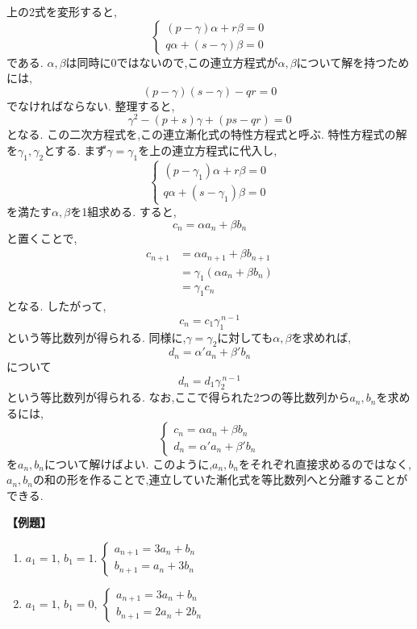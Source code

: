 上の2式を変形すると,
\[
  \begin{cases}
    (p-\gamma)\alpha+r\beta=0 \\
    q\alpha+(s-\gamma)\beta=0
  \end{cases}
\]
である.
$\alpha,\beta$は同時に$0$ではないので,この連立方程式が$\alpha,\beta$について解を持つためには,
\[
  (p-\gamma)(s-\gamma)-qr=0
\]
でなければならない.
整理すると,
\[
  \gamma^2-(p+s)\gamma+(ps-qr)=0
\]
となる.
この二次方程式を,この連立漸化式の特性方程式と呼ぶ.
特性方程式の解を$\gamma_1,\gamma_2$とする.
まず$\gamma=\gamma_1$を上の連立方程式に代入し,
\[
  \begin{cases}
    (p-\gamma_1)\alpha+r\beta=0 \\
    q\alpha+(s-\gamma_1)\beta=0
  \end{cases}
\]
を満たす$\alpha,\beta$を1組求める.
すると,
\[
  c_n=\alpha a_n+\beta b_n
\]
と置くことで,
\begin{align*}
  c_{n+1} & =\alpha a_{n+1}+\beta b_{n+1}   \\
          & =\gamma_1(\alpha a_n+\beta b_n) \\
          & =\gamma_1c_n
\end{align*}
となる.
したがって,
\[
  c_n=c_1\gamma_1^{\,n-1}
\]
という等比数列が得られる.
同様に,$\gamma=\gamma_2$に対しても$\alpha,\beta$を求めれば,
\[
  d_n=\alpha' a_n+\beta' b_n
\]
について
\[
  d_n=d_1\gamma_2^{\,n-1}
\]
という等比数列が得られる.
なお,ここで得られた2つの等比数列から$a_n,b_n$を求めるには,
\[
  \begin{cases}
    c_n=\alpha a_n+\beta b_n \\
    d_n=\alpha'a_n+\beta'b_n
  \end{cases}
\]
を$a_n,b_n$について解けばよい.
このように,$a_n,b_n$をそれぞれ直接求めるのではなく,$a_n,b_n$の和の形を作ることで,連立していた漸化式を等比数列へと分離することができる.

\noindent \textbf{【例題】}
\begin{enumerate}[label=(\arabic*),parsep=3pt]
  \item $\displaystyle a_1=1,\,b_1=1.\ \begin{cases}a_{n+1}=3a_n+b_n\\ b_{n+1}=a_n+3b_n\end{cases}$
  \item $\displaystyle a_1=1,\,b_1=0,\ \begin{cases}a_{n+1}=3a_n+b_n\\ b_{n+1}=2a_n+2b_n\end{cases}$
\end{enumerate}

